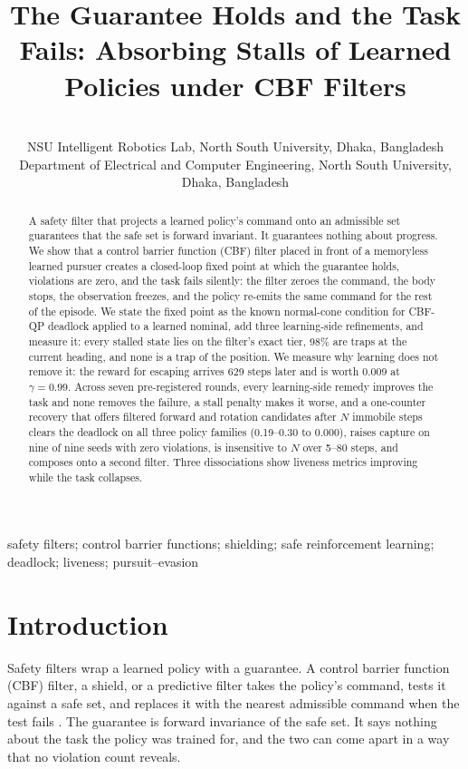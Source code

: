 \documentclass{l4dc2027}
\title[Safe and Stuck]{The Guarantee Holds and the Task Fails: Absorbing Stalls of Learned Policies under CBF Filters}
\author{%
 \Name{Mohammad Shoaib} \Email{[to confirm]}\\
 \addr NSU Intelligent Robotics Lab, North South University, Dhaka, Bangladesh
 \AND
 \Name{Shahnewaz Siddique} \Email{shahnewaz.siddique@northsouth.edu}\\
 \addr Department of Electrical and Computer Engineering, North South University, Dhaka, Bangladesh%
}
\begin{document}
\maketitle

\begin{abstract}%
A safety filter that projects a learned policy's command onto an admissible set guarantees that the safe set is forward invariant. It guarantees nothing about progress. We show that a control barrier function (CBF) filter placed in front of a memoryless learned pursuer creates a closed-loop fixed point at which the guarantee holds, violations are zero, and the task fails silently: the filter zeroes the command, the body stops, the observation freezes, and the policy re-emits the same command for the rest of the episode. We state the fixed point as the known normal-cone condition for CBF-QP deadlock applied to a learned nominal, add three learning-side refinements, and measure it: every stalled state lies on the filter's exact tier, 98\% are traps at the current heading, and none is a trap of the position. We measure why learning does not remove it: the reward for escaping arrives 629 steps later and is worth 0.009 at $\gamma = 0.99$. Across seven pre-registered rounds, every learning-side remedy improves the task and none removes the failure, a stall penalty makes it worse, and a one-counter recovery that offers filtered forward and rotation candidates after $N$ immobile steps clears the deadlock on all three policy families (0.19--0.30 to 0.000), raises capture on nine of nine seeds with zero violations, is insensitive to $N$ over 5--80 steps, and composes onto a second filter. Three dissociations show liveness metrics improving while the task collapses.%
\end{abstract}

\begin{keywords}%
safety filters; control barrier functions; shielding; safe reinforcement learning; deadlock; liveness; pursuit--evasion%
\end{keywords}

\section{Introduction}\label{sec:intro}

Safety filters wrap a learned policy with a guarantee. A control barrier function (CBF) filter, a shield, or a predictive filter takes the policy's command, tests it against a safe set, and replaces it with the nearest admissible command when the test fails \citep{hsu2024safetyfilter,ames2019cbf,alshiekh2018shielding,cheng2019endtoend}. The guarantee is forward invariance of the safe set. It says nothing about the task the policy was trained for, and the two can come apart in a way that no violation count reveals.
\end{document}
